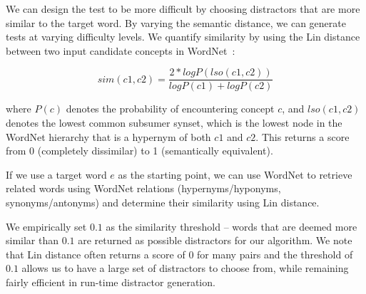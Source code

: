 
We can design the test to be more difficult by choosing distractors
that are more similar to the target word.  By varying the semantic
distance, we can generate tests at varying difficulty levels.  We
quantify similarity by using the Lin distance~\cite{Lin1998} between two
input candidate concepts in WordNet~\cite{Miller1995}:

\begin{equation}
sim(c1,c2) = \frac{2*log P(lso(c1,c2))}{log P(c1)+log P(c2)}
\label{equation:Distractor_4}
\end{equation}  

\noindent where $P(c)$ denotes the probability of encountering concept
$c$, and $lso(c1,c2)$ denotes the lowest common subsumer synset, which
is the lowest node in the WordNet hierarchy that is a hypernym of both
$c1$ and $c2$.  This returns a score from 0 (completely dissimilar) to
1 (semantically equivalent).

If we use a target word $e$ as the starting point, we can use WordNet
to retrieve related words using WordNet relations (hypernyms/hyponyms,
synonyms/antonyms) and determine their similarity using Lin distance.

We empirically set $0.1$ as the similarity threshold -- words that are
deemed more similar than $0.1$ are returned as possible distractors
for our algorithm.  We note that Lin distance often returns a score of
0 for many pairs and the threshold of $0.1$ allows us to have a large
set of distractors to choose from, while remaining fairly efficient in
run-time distractor generation.


